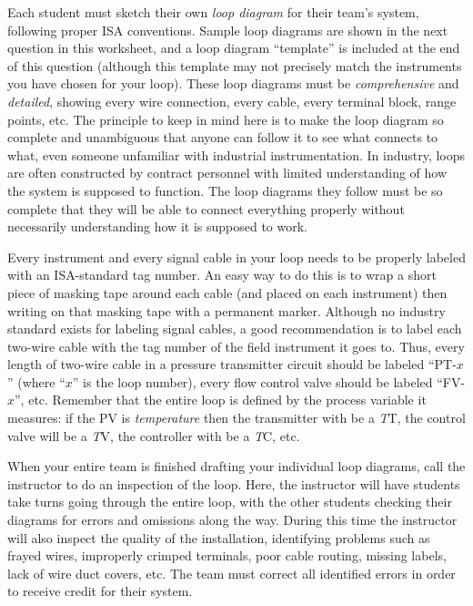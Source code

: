 Each student must sketch their own {\it loop diagram} for their team's system, following proper ISA conventions.  Sample loop diagrams are shown in the next question in this worksheet, and a loop diagram ``template'' is included at the end of this question (although this template may not precisely match the instruments you have chosen for your loop).  These loop diagrams must be {\it comprehensive} and {\it detailed}, showing every wire connection, every cable, every terminal block, range points, etc.  The principle to keep in mind here is to make the loop diagram so complete and unambiguous that anyone can follow it to see what connects to what, even someone unfamiliar with industrial instrumentation.  In industry, loops are often constructed by contract personnel with limited understanding of how the system is supposed to function.  The loop diagrams they follow must be so complete that they will be able to connect everything properly without necessarily understanding how it is supposed to work.

Every instrument and every signal cable in your loop needs to be properly labeled with an ISA-standard tag number.  An easy way to do this is to wrap a short piece of masking tape around each cable (and placed on each instrument) then writing on that masking tape with a permanent marker.  Although no industry standard exists for labeling signal cables, a good recommendation is to label each two-wire cable with the tag number of the field instrument it goes to.  Thus, every length of two-wire cable in a pressure transmitter circuit should be labeled ``PT-$x$'' (where ``$x$'' is the loop number), every flow control valve should be labeled ``FV-$x$'', etc.  Remember that the entire loop is defined by the process variable it measures: if the PV is {\it temperature} then the transmitter with be a {\it T}T, the control valve will be a {\it T}V, the controller with be a {\it T}C, etc.

When your entire team is finished drafting your individual loop diagrams, call the instructor to do an inspection of the loop.  Here, the instructor will have students take turns going through the entire loop, with the other students checking their diagrams for errors and omissions along the way.  During this time the instructor will also inspect the quality of the installation, identifying problems such as frayed wires, improperly crimped terminals, poor cable routing, missing labels, lack of wire duct covers, etc.  The team must correct all identified errors in order to receive credit for their system.  

